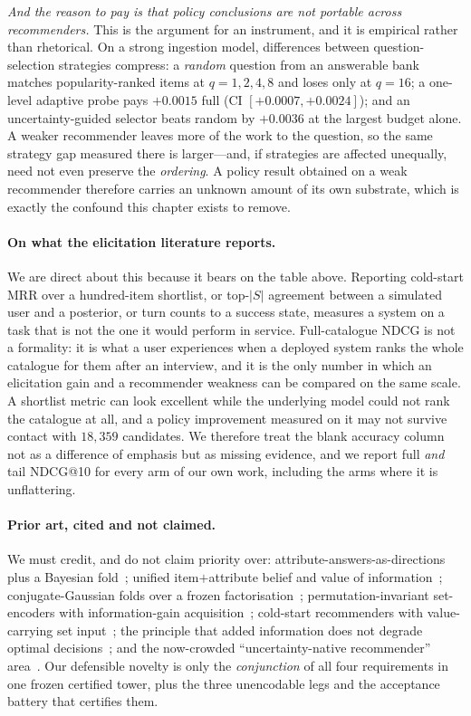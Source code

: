 \documentclass[11pt]{article}
\begin{document}
\emph{And the reason to pay is that policy conclusions are not portable across recommenders.} This is the
argument for an instrument, and it is empirical rather than rhetorical. On a strong ingestion model,
differences between question-selection strategies compress: a \emph{random} question from an answerable
bank matches popularity-ranked items at $q{=}1,2,4,8$ and loses only at $q{=}16$; a one-level adaptive
probe pays $+0.0015$ full (CI $[+0.0007,+0.0024]$); and an uncertainty-guided selector beats random by
$+0.0036$ at the largest budget alone. A weaker recommender leaves more of the work to the question, so the same strategy
gap measured there is larger---and, if strategies are affected unequally, need not even preserve the
\emph{ordering}. A policy result obtained on a weak recommender therefore carries an unknown amount of its
own substrate, which is exactly the confound this chapter exists to remove.

\paragraph{On what the elicitation literature reports.} We are direct about this because it bears on the
table above. Reporting cold-start MRR over a hundred-item shortlist, or top-$|S|$ agreement between a
simulated user and a posterior, or turn counts to a success state, measures a system on a task that is not
the one it would perform in service. Full-catalogue NDCG is not a formality: it is what a user experiences
when a deployed system ranks the whole catalogue for them after an interview, and it is the only number in
which an elicitation gain and a recommender weakness can be compared on the same scale. A shortlist metric
can look excellent while the underlying model could not rank the catalogue at all, and a policy improvement
measured on it may not survive contact with $18{,}359$ candidates. We therefore treat the blank accuracy
column not as a difference of emphasis but as missing evidence, and we report full \emph{and} tail
NDCG@10 for every arm of our own work, including the arms where it is unflattering.

\paragraph{Prior art, cited and not claimed.}
We must credit, and do not claim priority over: attribute-answers-as-directions plus a Bayesian
fold~\cite{biyik2023soft}; unified item$+$attribute belief and value of information~\cite{biyik2023soft,li2021seamlessly};
conjugate-Gaussian folds over a frozen factorisation~\cite{toroghi2023bcie}; permutation-invariant set-encoders with
information-gain acquisition~\cite{ma2019eddi}; cold-start recommenders with value-carrying set input~\cite{lin2021tanp};
the principle that added information does not degrade optimal
decisions~\cite{good1967principle,blackwell1953equivalent}; and the now-crowded ``uncertainty-native
recommender'' area~\cite{wang2025bdecf}. Our defensible novelty is only the \emph{conjunction} of all four requirements
in one frozen certified tower, plus the three unencodable legs and the acceptance battery that certifies them.
\end{document}
